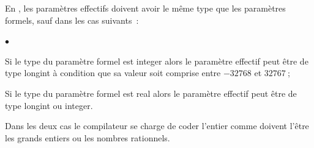 {\begin{minipage}{\myparboxwidth}
\smallskip

En \pascal, les paramètres effectifs doivent avoir le même type que les paramètres
formels, sauf dans les cas suivants~:
\begin{list}{$\scriptscriptstyle\bullet$}{
}
\item Si le type du paramètre formel est {\idt integer} alors le paramètre effectif peut
être de type {\idt longint} à condition que sa valeur soit comprise entre $-32768$ et $32767$$\:$;
\item Si le type du paramètre formel est {\idt real} alors le paramètre effectif peut
être de type {\idt longint} ou {\idt integer}.
\end{list}
 Dans les deux cas le compilateur se charge de coder l'entier 
 comme doivent l'être les grands entiers ou les nombres rationnels.
  
\vspace{\abovedisplayskip}
\end{minipage}
}
